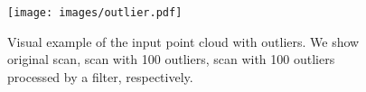\begin{figure}[!t]
  \centering
  \texttt{[image: images/outlier.pdf]}
  \caption{Visual example of the input point cloud with outliers. We show original scan, scan with 100 outliers, scan with 100 outliers processed by a filter, respectively.}
  \label{fig:outlier}
\end{figure}
